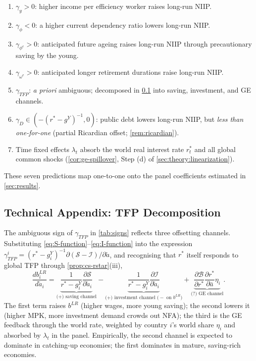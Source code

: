 \begin{enumerate}[noitemsep]
\item $\gamma_y>0$: higher income per efficiency worker raises long-run NIIP.
\item $\gamma_\phi<0$: a higher current dependency ratio lowers long-run NIIP.
\item $\gamma_{\phi^e}>0$: anticipated future ageing raises long-run NIIP through precautionary saving by the young.
\item $\gamma_{\omega^e}>0$: anticipated longer retirement durations raise long-run NIIP.
\item $\gamma_{TFP}$: \emph{a priori} ambiguous; decomposed in \cref{sec:theory:appendix} into saving, investment, and GE channels.
\item $\gamma_D\in(-(r^*-g^Y)^{-1},0)$: public debt lowers long-run NIIP, but \emph{less than one-for-one} (partial Ricardian offset; \cref{rem:ricardian}).
\item Time fixed effects $\lambda_t$ absorb the world real interest rate
$r_t^*$ and all global common shocks (\cref{cor:ge-spillover}, Step (d) of
\cref{sec:theory:linearization}).
\end{enumerate}

These seven predictions map one-to-one onto the panel coefficients estimated
in \cref{sec:results}.

\subsection{Technical Appendix: TFP Decomposition}\label{sec:theory:appendix}

The ambiguous sign of $\gamma_{TFP}$ in \cref{tab:signs} reflects three offsetting channels. Substituting \eqref{eq:S-function}--\eqref{eq:I-function} into the
expression $\gamma_{TFP}^i=(r^*-g_i^Y)^{-1}\partial(\mathcal{S}-\mathcal{I})/\partial\tilde a$, and recognising that $r^*$ itself responds to global TFP through \cref{prop:cs-rstar}(iii),
\begin{equation}
\frac{db_i^{LR}}{d\tilde a_i}=\underbrace{\frac{1}{r^*-g_i^Y}\frac{\partial\mathcal{S}}{\partial\tilde a_i}}_{\text{(+) saving channel}}-\underbrace{\frac{1}{r^*-g_i^Y}\frac{\partial\mathcal{I}}{\partial\tilde a_i}}_{\text{(+) investment channel (\(-\) on \(b^{LR}\))}}+\underbrace{\frac{\partial\mathcal{B}}{\partial r^*}\frac{\partial r^*}{\partial\bar a}\eta_i}_{\text{(?) GE channel}}.
\label{eq:tfp-decomp}
\end{equation}
The first term raises $b^{LR}$ (higher wages, more young saving); the second
lowers it (higher MPK, more investment demand crowds out NFA); the third is
the GE feedback through the world rate, weighted by country $i$'s world share
$\eta_i$ and absorbed by $\lambda_t$ in the panel. Empirically, the second
channel is expected to dominate in catching-up economies; the first dominates
in mature, saving-rich economies.

